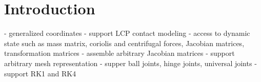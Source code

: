 \section{Introduction}
- generalized coordinates
- support LCP contact modeling
- access to dynamic state such as mass matrix, coriolis and
centrifugal forces, Jacobian matrices, transformation matrices
- assemble arbitrary Jacobian matrices
- support arbitrary mesh representation
- supper ball joints, hinge joints, universal joints
- support RK1 and RK4